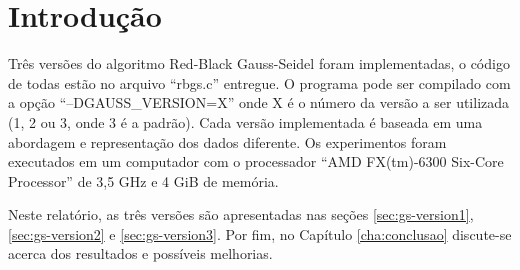 \chapter{Introdução}
\label{cha:introducao}

Três versões do algoritmo Red-Black Gauss-Seidel foram implementadas, o código de todas estão no arquivo ``rbgs.c'' entregue. O programa pode ser compilado com a opção ``--DGAUSS\_VERSION=X'' onde X é o número da versão a ser utilizada (1, 2 ou 3, onde 3 é a padrão). Cada versão implementada é baseada em uma abordagem e representação dos dados diferente. Os experimentos foram executados em um computador com o processador ``AMD FX(tm)-6300 Six-Core Processor'' de 3,5 GHz e 4 GiB de memória.

Neste relatório, as três versões são apresentadas nas seções \ref{sec:gs-version1}, \ref{sec:gs-version2} e \ref{sec:gs-version3}. Por fim, no Capítulo \ref{cha:conclusao} discute-se acerca dos resultados e possíveis melhorias.